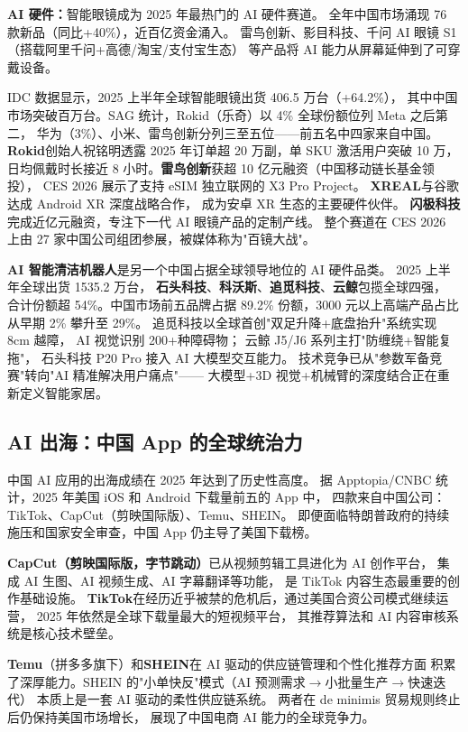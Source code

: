 \textbf{AI 硬件：}智能眼镜成为 2025 年最热门的 AI 硬件赛道。
全年中国市场涌现 76 款新品（同比+40\%），近百亿资金涌入。
雷鸟创新、影目科技、千问 AI 眼镜 S1（搭载阿里千问+高德/淘宝/支付宝生态）
等产品将 AI 能力从屏幕延伸到了可穿戴设备。

IDC 数据显示，2025 上半年全球智能眼镜出货 406.5 万台（+64.2\%），
其中中国市场突破百万台。SAG 统计，Rokid（乐奇）以 4\% 全球份额位列 Meta 之后第二，
华为（3\%）、小米、雷鸟创新分列三至五位——前五名中四家来自中国。
\textbf{Rokid}创始人祝铭明透露 2025 年订单超 20 万副，单 SKU 激活用户突破 10 万，
日均佩戴时长接近 8 小时。\textbf{雷鸟创新}获超 10 亿元融资（中国移动链长基金领投），
CES 2026 展示了支持 eSIM 独立联网的 X3 Pro Project。
\textbf{XREAL}与谷歌达成 Android XR 深度战略合作，
成为安卓 XR 生态的主要硬件伙伴。
\textbf{闪极科技}完成近亿元融资，专注下一代 AI 眼镜产品的定制产线。
整个赛道在 CES 2026 上由 27 家中国公司组团参展，被媒体称为"百镜大战"。

\textbf{AI 智能清洁机器人}是另一个中国占据全球领导地位的 AI 硬件品类。
2025 上半年全球出货 1535.2 万台，
\textbf{石头科技}、\textbf{科沃斯}、\textbf{追觅科技}、\textbf{云鲸}包揽全球四强，
合计份额超 54\%。中国市场前五品牌占据 89.2\% 份额，3000 元以上高端产品占比
从早期 2\% 攀升至 29\%。
追觅科技以全球首创"双足升降+底盘抬升"系统实现 8cm 越障，
AI 视觉识别 200+种障碍物；
云鲸 J5/J6 系列主打"防缠绕+智能复拖"，
石头科技 P20 Pro 接入 AI 大模型交互能力。
技术竞争已从"参数军备竞赛"转向"AI 精准解决用户痛点"——
大模型+3D 视觉+机械臂的深度结合正在重新定义智能家居。


\subsection{AI 出海：中国 App 的全球统治力}
\label{subsec:china-ai-global}

中国 AI 应用的出海成绩在 2025 年达到了历史性高度。
据 Apptopia/CNBC 统计，2025 年美国 iOS 和 Android 下载量前五的 App 中，
四款来自中国公司：TikTok、CapCut（剪映国际版）、Temu、SHEIN。
即便面临特朗普政府的持续施压和国家安全审查，中国 App 仍主导了美国下载榜。

\textbf{CapCut（剪映国际版，字节跳动）}已从视频剪辑工具进化为 AI 创作平台，
集成 AI 生图、AI 视频生成、AI 字幕翻译等功能，
是 TikTok 内容生态最重要的创作基础设施。
\textbf{TikTok}在经历近乎被禁的危机后，通过美国合资公司模式继续运营，
2025 年依然是全球下载量最大的短视频平台，
其推荐算法和 AI 内容审核系统是核心技术壁垒。

\textbf{Temu}（拼多多旗下）和\textbf{SHEIN}在 AI 驱动的供应链管理和个性化推荐方面
积累了深厚能力。SHEIN 的"小单快反"模式（AI 预测需求$\to$小批量生产$\to$快速迭代）
本质上是一套 AI 驱动的柔性供应链系统。
两者在 de minimis 贸易规则终止后仍保持美国市场增长，
展现了中国电商 AI 能力的全球竞争力。

